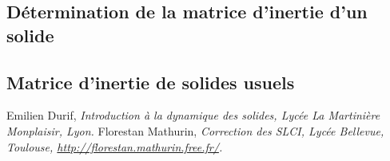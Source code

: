 \documentclass[10pt,fleqn]{article} %
\begin{document}
\subsection{Détermination de la matrice d'inertie d'un solide}


\subsection{Matrice d'inertie de solides usuels}


\begin{thebibliography}{2}
    Emilien Durif, {\it Introduction à la dynamique des solides, Lycée La Martinière Monplaisir, Lyon.}
       Florestan Mathurin, {\it Correction des SLCI, Lycée Bellevue, Toulouse, \url{http://florestan.mathurin.free.fr/}.}



\end{thebibliography}
\end{document}

